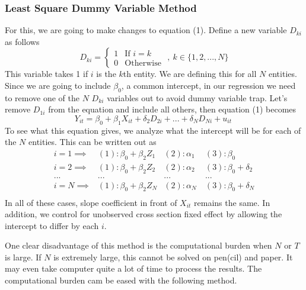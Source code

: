 \documentclass[12pt]{article}
\theoremstyle{definition}
\theoremstyle{property}
\theoremstyle{assumption}
\theoremstyle{example}
\theoremstyle{comment}
\begin{document}
\subsubsection{Least Square Dummy Variable Method}
For this, we are going to make changes to equation (1). Define a new variable $D_{ki}$ as follows
\[
D_{ki} = \begin{cases} 1 & \text{If $i=k$} \\
                                     0 & \text{Otherwise } \end{cases} , \ k\in\{1,2,...,N\}
\] 
This variable takes 1 if $i$ is the $k$th entity. We are defining this for all $N$ entities. Since we are going to include $\beta_0$, a common intercept, in our regression we need to remove one of the $N$ $D_{ki}$ variables out to avoid dummy variable trap. Let's remove $D_{1i}$ from the equation and include all others, then equation (1) becomes
\[
Y_{it} = \beta_0 +\beta_1X_{it}+\delta_2D_{2i} + ... + \delta_ND_{Ni}+u_{it} \ \tag{LSDV}
\]
To see what this equation gives, we analyze what the intercept will be for each of the $N$ entities. This can be written out as
\[
\begin{aligned}
i=1 \implies & (1): \beta_0 + \beta_2Z_1 &(2): \alpha_1 \ & (3): \beta_0\\ 
i=2 \implies & (1): \beta_0 + \beta_2Z_2 &(2): \alpha_2 \ & (3): \beta_0+\delta_2\\ 
...&...&...&...\\
i=N \implies & (1): \beta_0 + \beta_2Z_N &(2): \alpha_N \ & (3): \beta_0+\delta_N\\ 
\end{aligned}
\]
In all of these cases, slope coefficient in front of $X_{it}$ remains the same. In addition, we control for unobserved cross section fixed effect by allowing the intercept to differ by each $i$. \par\medskip
One clear disadvantage of this method is the computational burden when $N$ or $T$ is large. If $N$ is extremely large, this cannot be solved on pen(cil) and paper. It may even take computer quite a lot of time to process the results. The computational burden cam be eased with the following method. \par\medskip
\end{document}
